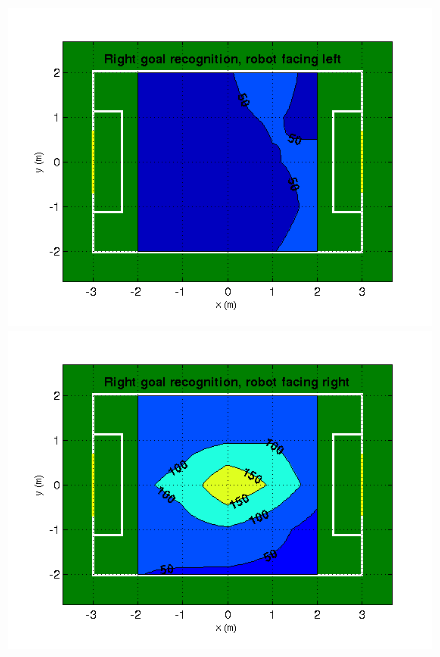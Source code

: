 \documentclass[runningheads,a4paper]{llncs}
\begin{document}
\begin{figure} [h]
\begin{minipage}[b]{0.5\textwidth}
\centering
\includegraphics[width=1\textwidth]{figures/RLhard}
\end{minipage}
\begin{minipage}[b]{0.5\textwidth}
\centering
\includegraphics[width=1\textwidth]{figures/RRhard}
\end{minipage}
\begin{minipage}[b]{0.5\textwidth}
\centering

\end{minipage}
\end{figure}
\end{document}
